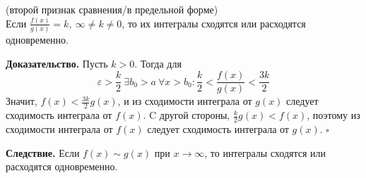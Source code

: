 \begin{theor} (второй признак сравнения/в предельной форме)\\
Если $\frac{f(x)}{g(x)}=k,~\infty\ne k\ne0$, то их интегралы сходятся или
расходятся одновременно. 
\end{theor}
\textbf{Доказательство.} Пусть $k>0$. Тогда для
 $$\varepsilon>\frac{k}{2}~\exists b_0>a~\forall x>b_0:\frac{k}{2}<
 \frac{f(x)}{g(x)}<\frac{3k}{2}$$ 
Значит, $f(x)< \frac{3k}{2}g(x)$, и из сходимости интеграла от $g(x)$ следует
сходимость интеграла от $f(x)$. C другой стороны, $\frac{k}{2}g(x)<f(x)$, 
поэтому из сходимости интеграла от $f(x)$ следует сходимость интеграла от 
$g(x)$. $\square$ 

\textbf{Следствие.} Если $f(x)\sim g(x)$ при $x\to \infty$, то интегралы 
сходятся или расходятся одновременно. 




















